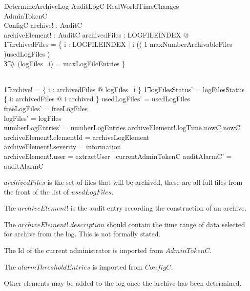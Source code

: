 \begin{schema}{DetermineArchiveLog}
        \Delta AuditLogC
\also
        RealWorldTimeChanges
\\      AdminTokenC
\\      ConfigC
\also
        archive! : \finset AuditC
\\      archiveElement! : AuditC
\where
        \exists archivedFiles : \finset LOGFILEINDEX @
\\ \t1           archivedFiles =  \{ i : LOGFILEINDEX | i \in \ran
        (( 1 \upto maxNumberArchivableFiles )\dres usedLogFiles ) 
\\ \t3 
        \land \# (logFiles~ i) = maxLogFileEntries  \}

\\ \t1  \land archive! = \bigcup \{ i : archivedFiles @ logFiles~ i \}
\also 
   \t1  \land logFilesStatus' = logFilesStatus \oplus \{ i: archivedFiles @ i
   \mapsto archived \}
\also
        usedLogFiles' = usedLogFiles
\\        freeLogFiles' = freeLogFiles
\\        logFiles' = logFiles
\\        numberLogEntries' = numberLogEntries
\also
        archiveElement!.logTime \in nowC \upto nowC'
\\      archiveElement!.elementId = archiveLogElement
\\      archiveElement!.severity = information
\\      archiveElement!.user = extractUser~ currentAdminTokenC 
\also
        auditAlarmC' = auditAlarmC
\end{schema}
\begin{Zcomment}
\item
$archivedFiles$ is the set of files that will be archived, these are
all full files from the front of the list of $usedLogFiles$.
 \item
The $archiveElement!$ is the audit entry recording the
construction of an archive.
\item
The $archiveElement!.description$ should contain the time range of
data selected for archive from
the log. This is not formally stated.
\item 
The Id of the current administrator is imported from
$AdminTokenC$.
\item
The $alarmThresholdEntries$ is imported from $ConfigC$.
\end{Zcomment}

Other elements may be added to the log once the archive has been determined.

